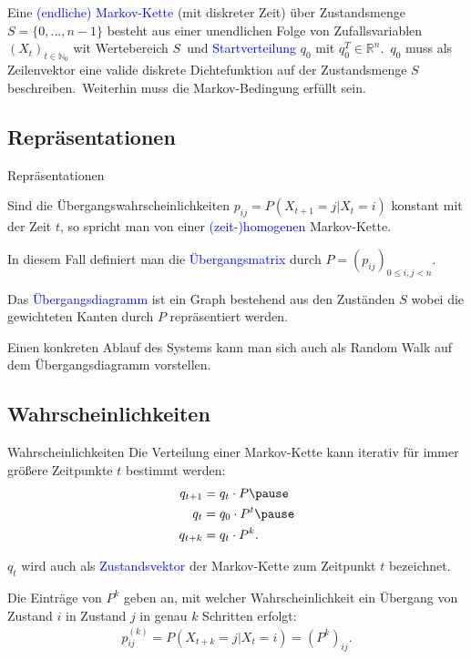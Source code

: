\documentclass{beamer}
\def\padding{\vspace{0.5cm}}
\def\spadding{\vspace{0.25cm}}
\def\b{\textcolor{blue}}
\begin{document}
\begin{frame}
    \begin{definition}
        Eine \b{(endliche) Markov-Kette} (mit diskreter Zeit) über Zustandsmenge $S = \{0, \dots, n-1\}$ besteht aus einer unendlichen Folge von Zufallsvariablen $(X_t)_{t \in \mathbb{N}_0}$ wit Wertebereich $S$\pause\ und \b{Startverteilung} $q_0$ mit $q_0^T \in \mathbb{R}^n$.\pause\ $q_0$ muss als Zeilenvektor eine valide diskrete Dichtefunktion auf der Zustandsmenge $S$ beschreiben.\pause\ Weiterhin muss die Markov-Bedingung erfüllt sein.
    \end{definition}
\end{frame}

\subsection{Repräsentationen}
\begin{frame}{Repräsentationen}
    \begin{definition}
        Sind die Übergangswahrscheinlichkeiten $p_{ij} = P(X_{t+1} = j | X_t = i)$ konstant mit der Zeit $t$, so spricht man von einer \b{(zeit-)homogenen} Markov-Kette.\par\pause\spadding
        In diesem Fall definiert man die \b{Übergangsmatrix} durch $P = (p_{ij})_{0 \leq i, j < n}$.\par\pause\spadding
        Das \b{Übergangsdiagramm} ist ein Graph bestehend aus den Zuständen $S$ wobei die gewichteten Kanten durch $P$ repräsentiert werden.
    \end{definition}\par\pause\padding
    Einen konkreten Ablauf des Systems kann man sich auch als Random Walk auf dem Übergangsdiagramm vorstellen.
\end{frame}

\subsection{Wahrscheinlichkeiten}
\begin{frame}{Wahrscheinlichkeiten}
    Die Verteilung einer Markov-Kette kann iterativ für immer größere Zeitpunkte $t$ bestimmt werden:
    \begin{align*}
        q_{t+1} &= q_t \cdot P\pause \\
        q_t     &= q_0 \cdot P^t\pause \\
        q_{t+k} &= q_t \cdot P^k.
    \end{align*}\pause
    \begin{definition}
        $q_t$ wird auch als \b{Zustandsvektor} der Markov-Kette zum Zeitpunkt $t$ bezeichnet.
    \end{definition}\par\pause\padding
    Die Einträge von $P^k$ geben an, mit welcher Wahrscheinlichkeit ein Übergang von Zustand $i$ in Zustand $j$ in genau $k$ Schritten erfolgt:
    \begin{align*}
        p_{ij}^{(k)} = P(X_{t+k} = j | X_t = i) = (P^k)_{ij}.
    \end{align*}
\end{frame}
\end{document}
